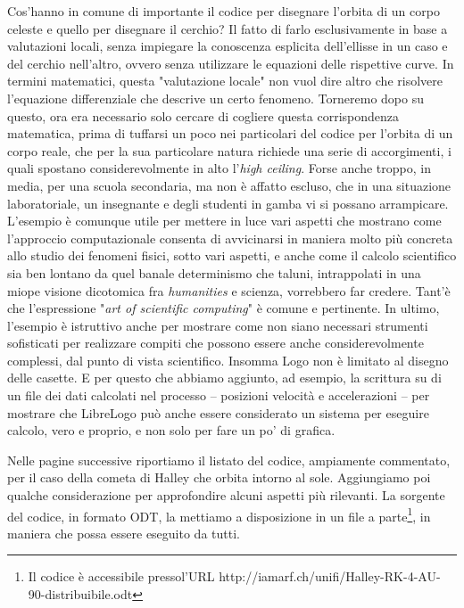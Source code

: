 Cos'hanno in comune di importante il codice per disegnare l'orbita di un corpo celeste e quello per disegnare il cerchio? Il fatto di farlo esclusivamente in base a valutazioni locali, senza impiegare la conoscenza esplicita dell'ellisse in un caso e del cerchio nell'altro, ovvero senza utilizzare le equazioni delle rispettive curve. In termini matematici, questa "valutazione locale" non vuol dire altro che risolvere l'equazione differenziale che descrive un certo fenomeno. Torneremo dopo su questo, ora era necessario solo cercare di cogliere questa corrispondenza matematica, prima di tuffarsi un poco nei particolari del codice per l'orbita di un corpo reale, che per la sua particolare natura richiede una serie di accorgimenti, i quali spostano considerevolmente in alto l'\textit{high ceiling}. Forse anche troppo, in media, per  una scuola secondaria, ma non è affatto escluso, che in una situazione laboratoriale, un insegnante e degli studenti in gamba vi si possano arrampicare. L'esempio è comunque utile per mettere in luce vari aspetti che mostrano come l'approccio computazionale consenta di avvicinarsi in maniera molto più concreta allo studio dei fenomeni fisici, sotto vari aspetti, e anche come il calcolo scientifico sia ben lontano da quel banale determinismo che taluni, intrappolati in una miope visione dicotomica fra \textit{humanities} e scienza, vorrebbero far credere. Tant'è che l'espressione "\textit{art of scientific computing}" è comune e pertinente. In ultimo, l'esempio è istruttivo anche per mostrare come non siano necessari strumenti sofisticati per realizzare compiti che possono essere anche considerevolmente complessi, dal punto di vista scientifico.  Insomma Logo non è limitato al disegno delle casette. E per questo che abbiamo aggiunto, ad esempio, la scrittura su di un file dei dati calcolati nel processo –  posizioni velocità e accelerazioni – per mostrare che LibreLogo può anche essere considerato un sistema per eseguire calcolo, vero e proprio, e non solo per fare un po' di grafica. 

Nelle pagine successive riportiamo il listato del codice, ampiamente commentato, per il caso della cometa di Halley che orbita intorno al sole. Aggiungiamo poi qualche considerazione per approfondire alcuni aspetti più rilevanti. La sorgente del codice, in formato ODT, la mettiamo a disposizione in un file a parte\footnote{Il codice è accessibile pressol'URL http://iamarf.ch/unifi/Halley-RK-4-AU-90-distribuibile.odt}, in maniera che possa essere eseguito da tutti. 

\vskip 1cm

